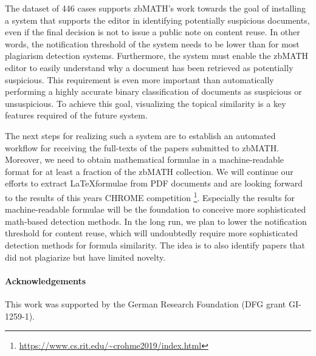 \documentclass{llncs}
\begin{document}
The dataset of 446 cases supports zbMATH's work towards the goal of installing a system that supports the editor in identifying potentially suspicious documents, even if the final decision is not to issue a public note on content reuse. In other words, the notification threshold of the system needs to be lower than for most plagiarism detection systems. Furthermore, the system must enable the zbMATH editor to easily understand why a document has been retrieved as potentially suspicious. This requirement is even more important than automatically performing a highly accurate binary classification of documents as suspicious or unsuspicious. To achieve this goal, visualizing the topical similarity is a key features required of the future system.

The next steps for realizing such a system are to establish an automated workflow for receiving the full-texts of the papers submitted to zbMATH. Moreover, we need to obtain mathematical formulae in a machine-readable format for at least a fraction of the zbMATH collection.  We will continue our efforts to extract \LaTeX formulae from PDF documents and are looking forward to the results of this years CHROME competition \footnote{\url{https://www.cs.rit.edu/~crohme2019/index.html}}. Especially the results for machine-readable formulae will be the foundation to conceive more sophisticated math-based detection methods.
In the long run, we plan to lower the notification threshold for content reuse, which will undoubtedly require more sophisticated detection methods for formula similarity. The idea is to also identify papers that did not plagiarize but have limited novelty.

\paragraph*{Acknowledgements}

This work was supported by the German Research Foundation (DFG grant GI-1259-1).

\printbibliography[keyword=primary]
\appendix
\end{document}

